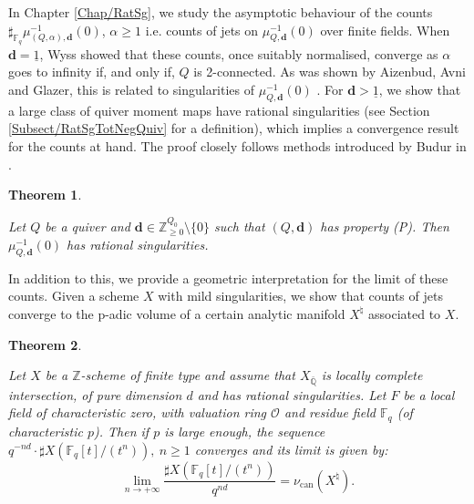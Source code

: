 \documentclass[11pt,english]{article}
\numberwithin{equation}{section}
\numberwithin{figure}{section}
\theoremstyle{definition}
\theoremstyle{plain}
\newtheorem{thmintro}{Theorem}
\theoremstyle{remark}
\newcommand\dd{\mathbf{d}}
\newcommand\ZZ{\mathbb{Z}}
\newcommand\QQ{\mathbb{Q}}
\newcommand\FF{\mathbb{F}}
\begin{document}
In Chapter \ref{Chap/RatSg}, we study the asymptotic behaviour of
the counts $\sharp_{\FF_{q}}\mu_{(Q,\alpha),\dd}^{-1}(0)$, $\alpha\geq1$
i.e. counts of jets on $\mu_{Q,\dd}^{-1}(0)$ over finite fields.
When $\dd=\underline{1}$, Wyss showed that these counts, once suitably
normalised, converge as $\alpha$ goes to infinity if, and only if,
$Q$ is 2-connected. As was shown by Aizenbud, Avni and Glazer, this
is related to singularities of $\mu_{Q,\dd}^{-1}(0)$ \cite{AA18,Gla19}.
For $\dd>\underline{1}$, we show that a large class of quiver moment
maps have rational singularities (see Section \ref{Subsect/RatSgTotNegQuiv}
for a definition), which implies a convergence result for the counts
at hand. The proof closely follows methods introduced by Budur in
\cite{Bud21}.

\begin{thmintro} \label{Thm/IntroRatSgTotNeg}

Let $Q$ be a quiver and $\dd\in\ZZ_{\geq0}^{Q_{0}}\setminus\{0\}$
such that $(Q,\dd)$ has property (P). Then $\mu_{Q,\dd}^{-1}(0)$
has rational singularities.

\end{thmintro}

In addition to this, we provide a geometric interpretation for the
limit of these counts. Given a scheme $X$ with mild singularities,
we show that counts of jets converge to the p-adic volume of a certain
analytic manifold $X^{\natural}$ associated to $X$.

\begin{thmintro} \label{Thm/IntroJetCountCanMeas}

Let $X$ be a $\mathbb{Z}$-scheme of finite type and assume that
$X_{\bar{\QQ}}$ is locally complete intersection, of pure dimension
$d$ and has rational singularities. Let $F$ be a local field of
characteristic zero, with valuation ring $\mathcal{O}$ and residue
field $\FF_{q}$ (of characteristic $p$). Then if $p$ is large enough,
the sequence $q^{-nd}\cdot\sharp X(\mathbb{F}_{q}[t]/(t^{n})),\ n\geq1$
converges and its limit is given by:\[
\underset{n\rightarrow +\infty}{\lim}\frac{\sharp X(\mathbb{F}_{q}[t]/(t^{n}))}{q^{nd}}
=
\nu_{\mathrm{can}}(X^{\natural}).
\]\end{thmintro}
\end{document}
